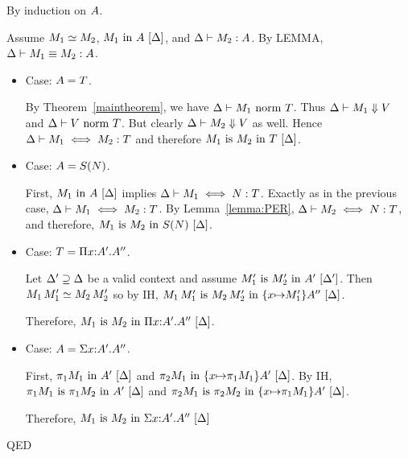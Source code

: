 \documentclass{article}
\theoremstyle{break}
\newcommand{\qed}{\mbox{QED}}
\newenvironment{proof}{\noindent{\bf Proof:}\hspace*{0.5em}}{\hspace*{\fill}\qed}
\begin{document}
\begin{proof}
By induction on $\kind$. 

Assume $\headexpand{\constructor_1}{\constructor_2}$,
$\semanticvalidterm{\world}{\constructor_1}{\kind}$, and
$\validconstructor{\world}{\constructor_2}{\kind}$.  By LEMMA, 
$\equivconstructor{\world}{\constructor_1}{\constructor_2}{\kind}$.

\begin{itemize}
\item Case: $\kind = \ktype$.  

By Theorem~\ref{maintheorem}, we have
$\normterm{\world}{\constructor_1}{\ktype}$.
Thus $\headnormsto{\world}{\constructor_1}{\ktype}{\cvalue}$
and $\normterm{\world}{\cvalue}{\ktype}$.
But clearly 
$\headnormsto{\world}{\constructor_2}{\ktype}{\cvalue}$
as well.  Hence
$\aconequiv{\world}{\constructor_1}{\constructor_2}{\ktype}$
and therefore
$\semanticequivterm{\world}{\constructor_1}{\constructor_2}{\ktype}$.

\item Case: $\kind=\ksingleton{\otherconstructor}$.

First, 
$\semanticvalidterm{\world}{\constructor_1}{\kind}$
implies
$\aconequiv{\world}{\constructor_1}{\otherconstructor}{\ktype}$.
Exactly as in the previous case,
$\aconequiv{\world}{\constructor_1}{\constructor_2}{\ktype}$.
By Lemma~\ref{lemma:PER},
$\aconequiv{\world}{\constructor_2}{\otherconstructor}{\ktype}$, and
therefore,
$\semanticequivterm{\world}{\constructor_1}{\constructor_2}{\ksingleton{\otherconstructor}}$.

\item Case: $\ktype = \kpi{\cvar}{\kind'}{\kind''}$.

Let $\world'\supseteq\world$ be a valid context and assume
$\semanticequivterm{\world'}{\constructor'_1}{\constructor'_2}{\kind'}$.
Then $\headexpand{\capply{\constructor_1}{\constructor'_1}}{\capply{\constructor_2}{\constructor'_2}}$
so by IH,
$\semanticequivterm{\world}{\capply{\constructor_1}{\constructor'_1}}
   {\capply{\constructor_2}{\constructor'_2}}{\substitute{\cvar}{\constructor'_1}\kind''}$.

Therefore,
$\semanticequivterm{\world}{\constructor_1}{\constructor_2}{\kpi{\cvar}{\kind'}{\kind''}}$.

\item Case: $\kind=\ksigma{\cvar}{\kind'}{\kind''}$.

First, $\semanticvalidterm{\world}{\cpi{1}{\constructor_1}}{\kind'}$ and
$\semanticvalidterm{\world}{\cpi{2}{\constructor_1}}{\substitute{\cvar}{\cpi{1}{\constructor_1}}{\kind'}}$.
By IH,
$\semanticequivterm{\world}{\cpi{1}{\constructor_1}}{\cpi{1}{\constructor_2}}{\kind'}$ and
$\semanticequivterm{\world}{\cpi{2}{\constructor_1}}{\cpi{2}{\constructor_2}}
    {\substitute{\cvar}{\cpi{1}{\constructor_1}}{\kind'}}$.

Therefore, 
$\semanticequivterm{\world}{\constructor_1}{\constructor_2}{\ksigma{\cvar}{\kind'}{\kind''}}$

\end{itemize}
\end{proof}
\end{document}
